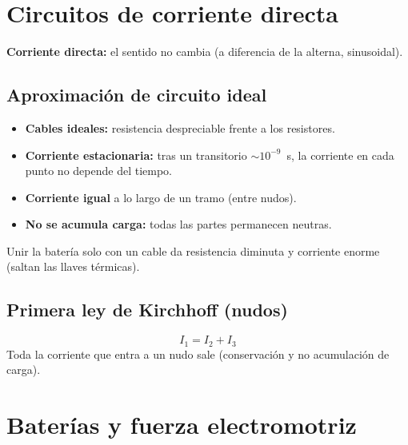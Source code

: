\documentclass[12pt,a4paper]{article}
\begin{document}
\section{Circuitos de corriente directa}

\textbf{Corriente directa:} el sentido no cambia (a diferencia de la
alterna, sinusoidal).

\subsection{Aproximación de circuito ideal}

\begin{itemize}[nosep]
  \item \textbf{Cables ideales:} resistencia despreciable frente a los
        resistores.
  \item \textbf{Corriente estacionaria:} tras un transitorio $\sim
        10^{-9}$~s, la corriente en cada punto no depende del tiempo.
  \item \textbf{Corriente igual} a lo largo de un tramo (entre nudos).
  \item \textbf{No se acumula carga:} todas las partes permanecen
        neutras.
\end{itemize}

\begin{warnbox}[Cortocircuito]
  Unir la batería solo con un cable da resistencia diminuta y corriente
  enorme (saltan las llaves térmicas).
\end{warnbox}

\subsection{Primera ley de Kirchhoff (nudos)}

\begin{keybox}
  \[
  \boxed{I_1 = I_2 + I_3}
  \]
  Toda la corriente que entra a un nudo sale (conservación y no
  acumulación de carga).
\end{keybox}



\section{Baterías y fuerza electromotriz}
\end{document}
